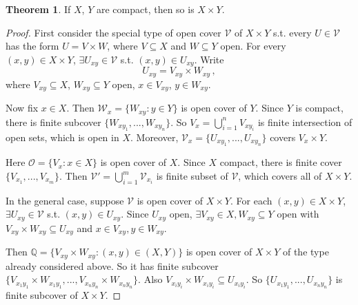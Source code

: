 \documentclass[a4paper,11pt]{article}
\theoremstyle{definition}
\newtheorem*{thm}{Theorem}
\numberwithin{equation}{section}
\begin{document}
\begin{thm}
If $X$, $Y$ are compact, then so is $X\times Y$.

\begin{proof}
    First consider the special type of open cover $\mathcal{V}$ of $X\times Y$ s.t. every $U\in\mathcal{V}$ has the form $U=V\times W$, where $V\subseteq X$ and $W\subseteq Y$ open. For every $(x,y)\in X\times Y$, $\exists U_{xy}\in\mathcal{V}$ s.t. $(x,y)\in U_{xy}$. Write
    \[
    U_{xy}=V_{xy}\times W_{xy}\,,
    \]
    where $V_{xy}\subseteq X$, $W_{xy}\subseteq Y$ open, $x\in V_{xy}$, $y\in W_{xy}$.
    
    Now fix $x\in X$. Then $\mathcal{W}_x=\{W_{xy}:y\in Y\}$ is open cover of $Y$. Since $Y$ is compact, there is finite subcover $\{W_{xy_1},...,W_{xy_n}\}$. So $V_x=\bigcup^n_{i=1}V_{xy_i}$ is finite intersection of open sets, which is open in $X$. Moreover, $\mathcal{V}_x=\{U_{xy_1},...,U_{xy_n}\}$ covers $V_x\times Y$.
    
    \begin{figure}[h]
    \centering
    \end{figure}
    
    Here $\mathcal{O}=\{V_x:x\in X\}$ is open cover of $X$. Since $X$ compact, there is finite cover $\{V_{x_1},...,V_{x_m}\}$. Then $\mathcal{V}'=\bigcup_{i=1}^m\mathcal{V}_{x_i}$ is finite subset of $\mathcal{V}$, which covers all of $X\times Y$.
    
    In the general case, suppose $\mathcal{V}$ is open cover of $X\times Y$. For each $(x,y)\in X\times Y$, $\exists U_{xy}\in\mathcal{V}$ s.t. $(x,y)\in U_{xy}$. Since $U_{xy}$ open, $\exists V_{xy}\in X, W_{xy}\subseteq Y$ open with $V_{xy}\times W_{xy}\subseteq U_{xy}$ and $x\in V_{xy},y\in W_{xy}$.
    
    Then $\mathbb{Q}=\{V_{xy}\times W_{xy}:(x,y)\in(X,Y)\}$ is open cover of $X\times Y$ of the type already considered above. So it has finite subcover $\{V_{x_1y_1}\times W_{x_1y_1},...,V_{x_ny_n}\times W_{x_ny_n}\}$. Also $V_{x_iy_i}\times W_{x_iy_i}\subseteq U_{x_iy_i}$. So $\{U_{x_1y_1},...,U_{x_ny_n}\}$ is finite subcover of $X\times Y$.
\end{proof}
\end{thm}
\end{document}
